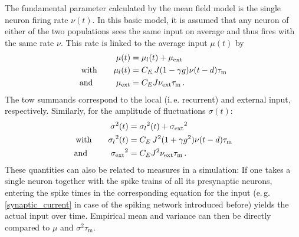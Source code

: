 The fundamental parameter calculated by the mean field model is the single neuron
firing rate $\nu(t)$. In this basic model, it is assumed that any neuron of either 
of the two populations sees the same input on average and thus fires with the same 
rate $\nu$. This rate is linked to the average input $\mu(t)$ by
\begin{equation}
    \begin{split}
        \mu(t)          &= \mu_l(t) + \mu_\text{ext} \\
        \text{with} \qquad \mu_l(t)        &= C_E \, J (1 - \gamma g) \nu(t - d) \tau_\text{m} \\
        \text{and~~\,} \qquad \mu_\text{ext}  &= C_E J \nu_\text{ext} \tau_\text{m} \,.
        \label{eq:mu}
    \end{split}
\end{equation}
The tow summands correspond to the local (i.\,e. recurrent) and 
external input, respectively.
Similarly, for the amplitude of fluctuations $\sigma(t)$:
\begin{equation}
    \begin{split}
        \sigma^2(t)     &= {\sigma_l}^2(t) + {\sigma_\text{ext}}^2 \\
        \text{with} \qquad      {\sigma_l}^2(t)       
                        &= C_E \, J^2 (1 + \gamma g^2) \nu(t - d) \tau_\text{m} \\
            \text{and~~\,}  \qquad    
        {\sigma_\text{ext}}^2  &= C_E J^2 \nu_\text{ext} \tau_\text{m} \,.
        \label{eq:sigma}
    \end{split}
\end{equation}
These quantities can also be related to measures in a simulation:
If one takes a single neuron together with the spike trains of all its
presynaptic neurons, entering the spike times in the corresponding 
equation for the input (e.\,g. \autoref{synaptic_current} in case of 
the spiking network introduced before) yields the actual input over time. 
Empirical mean and variance can then be directly compared to $\mu$ and 
$\sigma^2 \tau_\text{m} $.


